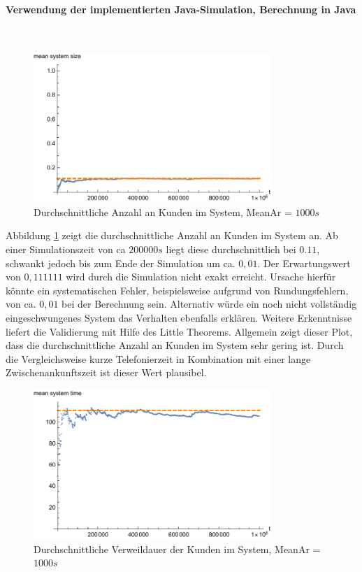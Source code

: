 \paragraph{Verwendung der implementierten Java-Simulation, Berechnung in Java}
\label{JavaOnePhone1000}
\\
\begin{figure}[htpb]
	\centering
	\includegraphics[width=0.8\textwidth]{abbildungen/1_Phone/Arrival_1000_Serve_100_dur_1000000_Skip_0/MeanSystemSize.pdf}
	\caption{Durchschnittliche Anzahl an Kunden im System, MeanAr = $1000s$}
	\label{fig:meanSystemSize1000}
\end{figure}

Abbildung \ref{fig:meanSystemSize1000} zeigt die durchschnittliche Anzahl an Kunden im System an. Ab einer Simulationszeit von ca $200000s$ liegt diese durchschnittlich bei $0.11$, schwankt jedoch bis zum Ende der Simulation um ca. $0,01$. Der Erwartungswert von $0,111111$ wird durch die Simulation nicht exakt erreicht. Ursache hierfür könnte ein systematischen Fehler, beispielsweise aufgrund von Rundungsfehlern, von ca. $0,01$ bei der Berechnung sein. Alternativ würde ein noch nicht vollständig eingeschwungenes System das Verhalten ebenfalls erklären. Weitere Erkenntnisse liefert die Validierung mit Hilfe des Little Theorems. Allgemein zeigt dieser Plot, dass die durchschnittliche Anzahl an Kunden im System sehr gering ist. Durch die Vergleichsweise kurze Telefonierzeit in Kombination mit einer lange Zwischenankunftszeit ist dieser Wert plausibel.

\begin{figure}[htpb]
	\centering
	\includegraphics[width=0.8\textwidth]{abbildungen/1_Phone/Arrival_1000_Serve_100_dur_1000000_Skip_0/MeanSystemTime.pdf}
	\caption{Durchschnittliche Verweildauer der Kunden im System, MeanAr = $1000s$}
	\label{fig:meanSystemTime1000}
\end{figure}

